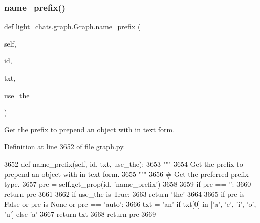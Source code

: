 \subsubsection{\texorpdfstring{name\+\_\+prefix()}{name\_prefix()}}
{\footnotesize\ttfamily def light\+\_\+chats.\+graph.\+Graph.\+name\+\_\+prefix (\begin{DoxyParamCaption}\item[{}]{self,  }\item[{}]{id,  }\item[{}]{txt,  }\item[{}]{use\+\_\+the }\end{DoxyParamCaption})}

\begin{DoxyVerb}Get the prefix to prepend an object with in text form.
\end{DoxyVerb}
 

Definition at line 3652 of file graph.\+py.


\begin{DoxyCode}
3652     \textcolor{keyword}{def }name\_prefix(self, id, txt, use\_the):
3653         \textcolor{stringliteral}{"""}
3654 \textcolor{stringliteral}{        Get the prefix to prepend an object with in text form.}
3655 \textcolor{stringliteral}{        """}
3656         \textcolor{comment}{# Get the preferred prefix type.}
3657         pre = self.get\_prop(id, \textcolor{stringliteral}{'name\_prefix'})
3658 
3659         \textcolor{keywordflow}{if} pre == \textcolor{stringliteral}{''}:
3660             \textcolor{keywordflow}{return} pre
3661 
3662         \textcolor{keywordflow}{if} use\_the \textcolor{keywordflow}{is} \textcolor{keyword}{True}:
3663             \textcolor{keywordflow}{return} \textcolor{stringliteral}{'the'}
3664 
3665         \textcolor{keywordflow}{if} pre \textcolor{keywordflow}{is} \textcolor{keyword}{False} \textcolor{keywordflow}{or} pre \textcolor{keywordflow}{is} \textcolor{keywordtype}{None} \textcolor{keywordflow}{or} pre == \textcolor{stringliteral}{'auto'}:
3666             txt = \textcolor{stringliteral}{'an'} \textcolor{keywordflow}{if} txt[0] \textcolor{keywordflow}{in} [\textcolor{stringliteral}{'a'}, \textcolor{stringliteral}{'e'}, \textcolor{stringliteral}{'i'}, \textcolor{stringliteral}{'o'}, \textcolor{stringliteral}{'u'] else '}a'
3667             \textcolor{keywordflow}{return} txt
3668         \textcolor{keywordflow}{return} pre
3669 
\end{DoxyCode}
\mbox{\label{classlight__chats_1_1graph_1_1Graph_ad9d86fc2b41fef8960a90b517d80cd81}} 
